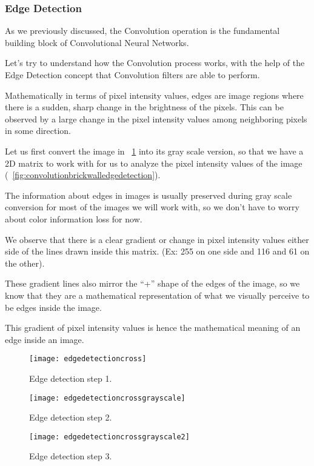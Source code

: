 	\subsubsection{Edge Detection}
	\begin{bulletedlist}
		\item As we previously discussed, the Convolution operation is the fundamental building block of Convolutional Neural Networks.

		\item Let's try to understand how the Convolution process works, with the help of the Edge Detection concept that Convolution filters are able to perform.
		\item Mathematically in terms of pixel intensity values, edges are image regions where there is a sudden, sharp change in the brightness of the pixels. This can be observed by a large change in the pixel intensity values among neighboring pixels in some direction.
		\item Let us first convert the image in \figurename~\ref{fig:edgedetectioncross} into its gray scale version, so that we have a 2D matrix to work with for us to analyze the pixel intensity values of the image (\figurename~\ref{fig:convolutionbrickwalledgedetection}).
		\item The information about edges in images is usually preserved during gray scale conversion for most of the images we will work with, so we don't have to worry about color information loss for now.
		\item We observe that there is a clear gradient or change in pixel intensity values either side of the lines drawn inside this matrix. (Ex: 255 on one side and 116 and 61 on the other).
		\item These gradient lines also mirror the ``+'' shape of the edges of the image, so we know that they are a mathematical representation of what we visually perceive to be edges inside the image.
		\item This gradient of pixel intensity values is hence the mathematical meaning of an edge inside an image.
		\begin{bulletedlist}
			\item
		\end{bulletedlist}
	\end{bulletedlist}

	\begin{figure}[htb]
		\centering
		\texttt{[image: edgedetectioncross]}
		\caption[Edge detection step 1]{Edge detection step 1.}
		\label{fig:edgedetectioncross}
	\end{figure}
	\begin{figure}[htb]
		\centering
		\texttt{[image: edgedetectioncrossgrayscale]}
		\caption[Edge detection step 2]{Edge detection step 2.}
		\label{fig:edgedetectioncrossgrayscale}
	\end{figure}
	\begin{figure}[htb]
		\centering
		\texttt{[image: edgedetectioncrossgrayscale2]}
		\caption[Edge detection step 3]{Edge detection step 3.}
		\label{fig:edgedetectioncrossgrayscale2}
	\end{figure}

